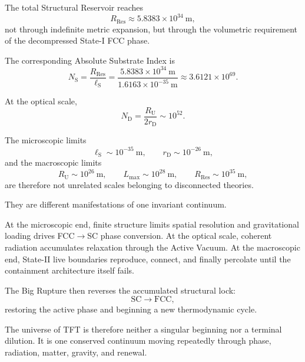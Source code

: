 The total Structural Reservoir reaches
\begin{equation}
    R_{\mathrm{Res}} \approx 5.8383\times10^{34}\ \mathrm{m},
\end{equation}
not through indefinite metric expansion, but through the volumetric requirement of the decompressed State-I FCC phase.

The corresponding Absolute Substrate Index is
\begin{equation}
    N_{\mathrm S} = \frac{R_{\mathrm{Res}}}{\ell_{\mathrm S}} = \frac{5.8383\times10^{34}\ \mathrm{m}}{1.6163\times10^{-35}\ \mathrm{m}} \approx 3.6121\times10^{69}.
\end{equation}

At the optical scale,
\begin{equation}
    N_{\mathrm D} = \frac{R_{\mathrm U}}{2r_{\mathrm D}} \sim 10^{52}.
\end{equation}

The microscopic limits
\begin{equation}
    \ell_{\mathrm S} \sim 10^{-35}\ \mathrm{m}, \qquad r_{\mathrm D} \sim 10^{-26}\ \mathrm{m},
\end{equation}
and the macroscopic limits
\begin{equation}
    R_{\mathrm U} \sim 10^{26}\ \mathrm{m}, \qquad L_{\mathrm{max}} \sim 10^{28}\ \mathrm{m}, \qquad R_{\mathrm{Res}} \sim 10^{35}\ \mathrm{m},
\end{equation}
are therefore not unrelated scales belonging to disconnected theories.

They are different manifestations of one invariant continuum.

At the microscopic end, finite structure limits spatial resolution and gravitational loading drives FCC$\rightarrow$SC phase conversion. At the optical scale, coherent radiation accumulates relaxation through the Active Vacuum. At the macroscopic end, State-II live boundaries reproduce, connect, and finally percolate until the containment architecture itself fails.

The Big Rupture then reverses the accumulated structural lock:
\begin{equation}
    \mathrm{SC} \longrightarrow \mathrm{FCC},
\end{equation}
restoring the active phase and beginning a new thermodynamic cycle.

The universe of TFT is therefore neither a singular beginning nor a terminal dilution. It is one conserved continuum moving repeatedly through phase, radiation, matter, gravity, and renewal.


